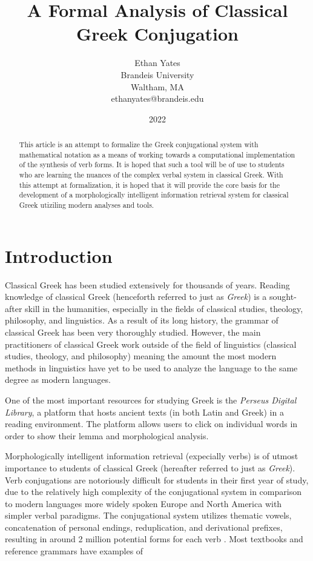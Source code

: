 \documentclass[12pt]{article}
\title{A Formal Analysis of Classical Greek Conjugation}
\author{Ethan Yates\\
        Brandeis University\\
        Waltham, MA\\
        ethanyates@brandeis.edu}
\date{2022}
\begin{document}
\newcommand{\koronis}[1]{#1\symbol{"0313}}
\newcommand{\dasia}[1]{#1\symbol{"0314}}
\newcommand{\macronbelow}[1]{#1\symbol{"0331}}
\newcommand{\cedilla}[1]{#1\symbol{"0326}}
\maketitle

\begin{abstract}
    This article is an attempt to formalize the Greek conjugational system with
    mathematical notation as a means of working towards a computational
    implementation of the synthesis of verb forms. It is hoped that such a tool
    will be of use to students who are learning the nuances of the complex
    verbal system in classical Greek. With this attempt at formalization, it is
    hoped that it will provide the core basis for the development of a
    morphologically intelligent information retrieval system for classical
    Greek utiziling modern analyses and tools.
\end{abstract}

\section{Introduction}

Classical Greek has been studied extensively for thousands of years. Reading
knowledge of classical Greek (henceforth referred to just as \textit{Greek}) is
a sought-after skill in the humanities, especially in the fields of classical
studies, theology, philosophy, and linguistics. As a result of its long
history, the grammar of classical Greek has been very thoroughly studied.
However, the main practitioners of classical Greek work outside of the field of
linguistics (classical studies, theology, and philosophy) meaning the amount the
most modern methods in linguistics have yet to be used to analyze the language to
the same degree as modern languages.

One of the most important resources for studying Greek is the
\textit{Perseus Digital Library}, a platform that hosts ancient texts (in both
Latin and Greek) in a reading environment. The platform allows users to click
on individual words in order to show their lemma and morphological analysis. 

Morphologically intelligent information retrieval (expecially verbs) is of
utmost importance to students of classical Greek (hereafter referred to just as
\textit{Greek}). Verb conjugations are notoriously difficult for students in
their first year of study, due to the relatively high complexity of the
conjugational system in comparison to modern languages more widely spoken
Europe and North America with simpler verbal paradigms. The conjugational
system utilizes thematic vowels, concatenation of personal endings,
reduplication, and derivational prefixes, resulting in around 2 million
potential forms for each verb \citep{crane91}. Most textbooks and reference
grammars have examples of
\end{document}
